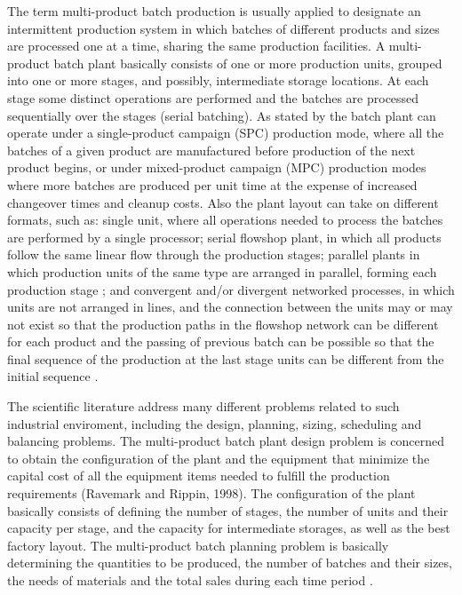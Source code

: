 \documentclass[10pt,fleqn,a4paper,twoside]{article}
\begin{document}
The term multi-product batch production is usually applied to designate an intermittent production system in which batches of different products and sizes are processed one at a time, sharing the same production facilities. A multi-product batch plant basically consists of one or more production units, grouped into one or more stages, and possibly, intermediate storage locations. At each stage some distinct operations are performed and the batches are processed sequentially over the stages (serial batching). As stated by \cite{PetkovMaranas1998} the batch plant can operate under a single-product campaign (SPC) production mode, where all the batches of a given product are manufactured before production of the next product begins, or under mixed-product campaign (MPC) production modes where more batches are produced per unit time at the expense of increased changeover times and cleanup costs. Also the plant layout can take on different formats, such as: single unit, where all operations needed to process the batches are performed by a single processor; serial flowshop plant, in which all products follow the same linear flow through the production stages; parallel plants in which production units of the same type are arranged in parallel, forming each production stage \citep{ShiEtAll2017}; and convergent and/or divergent networked processes, in which units are not arranged in lines, and the connection between the units may or may not exist so that the production paths in the flowshop network can be different for each product and the passing of previous batch can be possible so that the final sequence of the production at the last stage units can be different from the initial sequence \citep{KimEtAl1996}.

The scientific literature address many different problems related to such industrial enviroment, including the design, planning, sizing, scheduling and balancing problems. The multi-product batch plant design problem is concerned to obtain the configuration of the plant and the equipment that minimize the capital cost of all the equipment items needed to fulfill the production requirements (Ravemark and Rippin, 1998). The configuration of the plant basically consists of defining the number of stages, the number of units and their capacity per stage, and the capacity for intermediate storages, as well as the best factory layout. The multi-product batch planning problem is basically determining the quantities to be produced, the number of batches and their sizes, the needs of materials and the total sales during each time period \citep{FumeroEtAl2016}.
\end{document}
